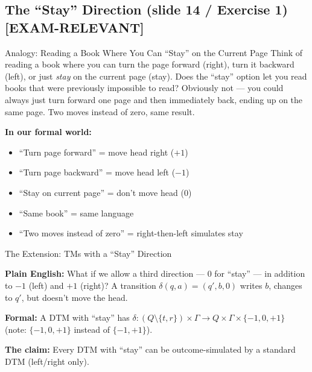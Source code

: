 \documentclass[11pt,a4paper]{article}
\newcommand{\kemark}{\textcolor{red!70!black}{\textbf{[EXAM-RELEVANT]}}}
\begin{document}
\subsection{The ``Stay'' Direction (slide 14 / Exercise 1) \kemark}

\begin{notebox}{Analogy: Reading a Book Where You Can ``Stay'' on the Current Page}
Think of reading a book where you can turn the page forward (right), turn it backward (left), or just \textit{stay} on the current page (stay). Does the ``stay'' option let you read books that were previously impossible to read? Obviously not --- you could always just turn forward one page and then immediately back, ending up on the same page. Two moves instead of zero, same result.

\textbf{In our formal world:}
\begin{itemize}[nosep]
\item ``Turn page forward'' = move head right ($+1$)
\item ``Turn page backward'' = move head left ($-1$)
\item ``Stay on current page'' = don't move head ($0$)
\item ``Same book'' = same language
\item ``Two moves instead of zero'' = right-then-left simulates stay
\end{itemize}
\end{notebox}

\begin{definitionbox}{{The Extension: TMs with a ``Stay'' Direction}}

\textbf{Plain English:} What if we allow a third direction --- $0$ for ``stay'' --- in addition to $-1$ (left) and $+1$ (right)? A transition $\delta(q, a) = (q', b, 0)$ writes $b$, changes to $q'$, but doesn't move the head.

\textbf{Formal:} A DTM with ``stay'' has $\delta\colon (Q \setminus \{t,r\}) \times \Gamma \to Q \times \Gamma \times \{-1, 0, +1\}$ (note: $\{-1, 0, +1\}$ instead of $\{-1, +1\}$).

\textbf{The claim:} Every DTM with ``stay'' can be outcome-simulated by a standard DTM (left/right only).
\end{definitionbox}
\end{document}
